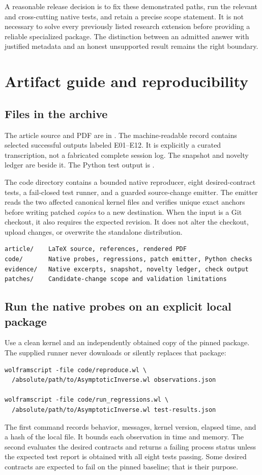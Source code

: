 \documentclass[11pt,a4paper]{article}
\newcommand{\code}[1]{\texttt{\detokenize{#1}}}
\begin{document}
A reasonable release decision is to fix these demonstrated paths, run the relevant and cross-cutting native tests, and retain a precise scope statement. It is not necessary to solve every previously listed research extension before providing a reliable specialized package. The distinction between an admitted answer with justified metadata and an honest unsupported result remains the right boundary.

\section{Artifact guide and reproducibility}\label{sec:artifacts}

\subsection{Files in the archive}
The article source and PDF are in \code{article/}. The machine-readable record  contains selected successful outputs labeled E01--E12. It is explicitly a curated transcription, not a fabricated complete session log. The snapshot and novelty ledger are beside it. The Python test output is \code{evidence/python-checks.txt}.

The code directory contains a bounded native reproducer, eight desired-contract tests, a fail-closed test runner, and a guarded source-change emitter. The emitter reads the two affected canonical kernel files and verifies unique exact anchors before writing patched \emph{copies} to a new destination. When the input is a Git checkout, it also requires the expected revision. It does not alter the checkout, upload changes, or overwrite the standalone distribution.

\begin{lstlisting}
article/    LaTeX source, references, rendered PDF
code/       Native probes, regressions, patch emitter, Python checks
evidence/   Native excerpts, snapshot, novelty ledger, check output
patches/    Candidate-change scope and validation limitations
\end{lstlisting}

\subsection{Run the native probes on an explicit local package}
Use a clean kernel and an independently obtained copy of the pinned package. The supplied runner never downloads or silently replaces that package:
\begin{lstlisting}
wolframscript -file code/reproduce.wl \
  /absolute/path/to/AsymptoticInverse.wl observations.json

wolframscript -file code/run_regressions.wl \
  /absolute/path/to/AsymptoticInverse.wl test-results.json
\end{lstlisting}
The first command records behavior, messages, kernel version, elapsed time, and a hash of the local file. It bounds each observation in time and memory. The second evaluates the desired contracts and returns a failing process status unless the expected test report is obtained with all eight tests passing. Some desired contracts are expected to fail on the pinned baseline; that is their purpose.
\end{document}
